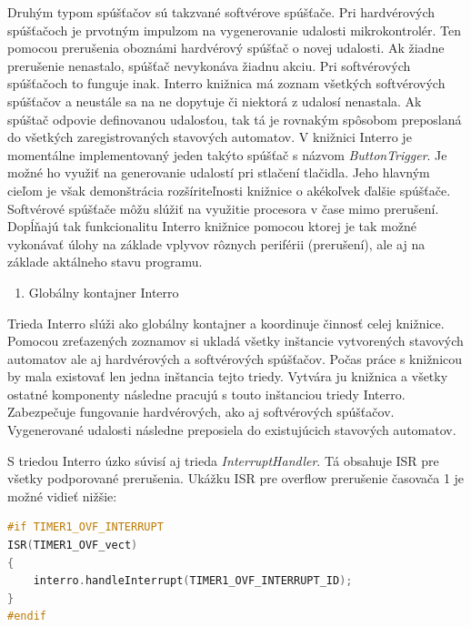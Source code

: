 Druhým typom spúšťačov sú takzvané softvérove spúšťače. Pri hardvérových spúšťačoch je prvotným impulzom na vygenerovanie udalosti mikrokontrolér. Ten pomocou prerušenia
oboznámi hardvérový spúšťač o novej udalosti. Ak žiadne prerušenie nenastalo, spúšťač nevykonáva žiadnu akciu. Pri softvérových spúšťačoch to funguje inak. Interro knižnica
má zoznam všetkých softvérových spúšťačov a neustále sa na ne dopytuje či niektorá z udalosí nenastala. Ak spúštač odpovie definovanou udalosťou,
tak tá je rovnakým spôsobom preposlaná do všetkých zaregistrovaných stavových automatov. V knižnici Interro je momentálne implementovaný jeden takýto spúšťač s názvom
\textit{ButtonTrigger}. Je možné ho využiť na generovanie udalostí pri stlačení tlačidla. Jeho hlavným cieľom je však demonštrácia rozšíriteľnosti  knižnice o akékoľvek
ďalšie spúšťače. Softvérové spúšťače môžu slúžiť na využitie procesora v čase mimo prerušení. Dopĺňajú tak funkcionalitu Interro knižnice pomocou ktorej je tak
možné vykonávať úlohy na základe vplyvov rôznych periférii (prerušení), ale aj na základe aktálneho stavu programu. \par

\begin{enumerate}[resume]
    \item Globálny kontajner Interro
\end{enumerate}

Trieda Interro slúži ako globálny kontajner a koordinuje činnosť celej knižnice. Pomocou zreťazených zoznamov si ukladá všetky inštancie vytvorených stavových automatov
ale aj hardvérových a softvérových spúšťačov. Počas práce s knižnicou by mala existovať len jedna inštancia tejto triedy. Vytvára ju knižnica a všetky ostatné komponenty
následne pracujú s touto inštanciou triedy Interro. Zabezpečuje fungovanie hardvérových, ako aj softvérových spúšťačov. Vygenerované udalosti následne preposiela do
existujúcich stavových automatov. \par
S triedou Interro úzko súvisí aj trieda \textit{InterruptHandler}. Tá obsahuje ISR pre všetky podporované prerušenia. Ukážku ISR pre overflow prerušenie časovača 1
je možné vidieť nižšie:
\begin{lstlisting}[language=c++]  
#if TIMER1_OVF_INTERRUPT
ISR(TIMER1_OVF_vect)
{
    interro.handleInterrupt(TIMER1_OVF_INTERRUPT_ID);
}
#endif
\end{lstlisting}


